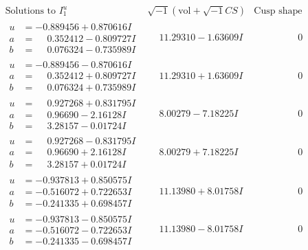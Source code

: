 \documentclass[1p]{elsarticle_modified}
\theoremstyle{definition}
\newcommand{\I}{\sqrt{-1}}
\begin{document}
$$\begin{array}{c|c|c}
\text{Solutions to }I^u_{1}& \I (\text{vol} + \sqrt{-1}CS) & \text{Cusp shape}\\
 \hline 
\begin{aligned}
u &= -0.889456 + 0.870616 I \\
a &= \phantom{-}0.352412 - 0.809727 I \\
b &= \phantom{-}0.076324 - 0.735989 I\end{aligned}
 & \phantom{-}11.29310 - 1.63609 I & \phantom{-0.000000 } 0 \\ \hline\begin{aligned}
u &= -0.889456 - 0.870616 I \\
a &= \phantom{-}0.352412 + 0.809727 I \\
b &= \phantom{-}0.076324 + 0.735989 I\end{aligned}
 & \phantom{-}11.29310 + 1.63609 I & \phantom{-0.000000 } 0 \\ \hline\begin{aligned}
u &= \phantom{-}0.927268 + 0.831795 I \\
a &= \phantom{-}0.96690 - 2.16128 I \\
b &= \phantom{-}3.28157 - 0.01724 I\end{aligned}
 & \phantom{-}8.00279 - 7.18225 I & \phantom{-0.000000 } 0 \\ \hline\begin{aligned}
u &= \phantom{-}0.927268 - 0.831795 I \\
a &= \phantom{-}0.96690 + 2.16128 I \\
b &= \phantom{-}3.28157 + 0.01724 I\end{aligned}
 & \phantom{-}8.00279 + 7.18225 I & \phantom{-0.000000 } 0 \\ \hline\begin{aligned}
u &= -0.937813 + 0.850575 I \\
a &= -0.516072 + 0.722653 I \\
b &= -0.241335 + 0.698457 I\end{aligned}
 & \phantom{-}11.13980 + 8.01758 I & \phantom{-0.000000 } 0 \\ \hline\begin{aligned}
u &= -0.937813 - 0.850575 I \\
a &= -0.516072 - 0.722653 I \\
b &= -0.241335 - 0.698457 I\end{aligned}
 & \phantom{-}11.13980 - 8.01758 I & \phantom{-0.000000 } 0 \\ \hline\begin{aligned}

\end{aligned}
\end{array}$$
\end{document}
